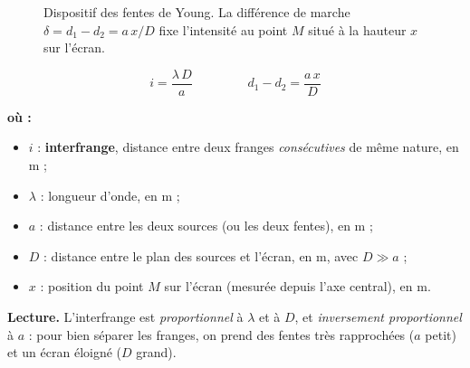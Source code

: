 \documentclass[11pt,a4paper]{article}
\newenvironment{ou}{%
  \par\smallskip\noindent\textbf{où :}\nopagebreak
  \begin{itemize}[leftmargin=1.8em,topsep=2pt,itemsep=1.5pt,parsep=0pt]}%
  {\end{itemize}}
\begin{document}
\begin{figure}[h]
\centering
{}
\caption{Dispositif des fentes de Young. La différence de marche
$\delta = d_1 - d_2 = a\,x/D$ fixe l'intensité au point $M$ situé à la hauteur $x$ sur l'écran.}
\label{fig:young}
\end{figure}

\begin{formule}
\[ \boxed{\,i = \frac{\lambda\,D}{a}\,}\qquad\qquad
   \boxed{\,d_1 - d_2 = \frac{a\,x}{D}\,} \]
\begin{ou}
  \item $i$ : \textbf{interfrange}, distance entre deux franges \emph{consécutives} de même
        nature, en \si{\metre} ;
  \item $\lambda$ : longueur d'onde, en \si{\metre} ;
  \item $a$ : distance entre les deux sources (ou les deux fentes), en \si{\metre} ;
  \item $D$ : distance entre le plan des sources et l'écran, en \si{\metre}, avec $D \gg a$ ;
  \item $x$ : position du point $M$ sur l'écran (mesurée depuis l'axe central), en \si{\metre}.
\end{ou}
\textbf{Lecture.} L'interfrange est \emph{proportionnel} à $\lambda$ et à $D$, et
\emph{inversement proportionnel} à $a$ : pour bien séparer les franges, on prend des fentes
très rapprochées ($a$ petit) et un écran éloigné ($D$ grand).
\end{formule}
\end{document}
